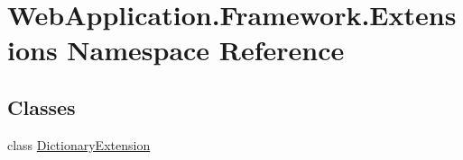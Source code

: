 \hypertarget{namespaceWebApplication_1_1Framework_1_1Extensions}{}\section{Web\+Application.\+Framework.\+Extensions Namespace Reference}
\label{namespaceWebApplication_1_1Framework_1_1Extensions}
\subsection*{Classes}
\begin{DoxyCompactItemize}
\item 
class \mbox{\hyperlink{classWebApplication_1_1Framework_1_1Extensions_1_1DictionaryExtension}{Dictionary\+Extension}}
\end{DoxyCompactItemize}
